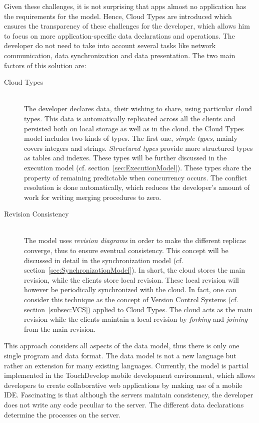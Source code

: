 \documentclass[a4paper,12pt]{report}
\begin{document}
Given these challenges, it is not surprising that apps almost no application has the requirements for the model. Hence, Cloud Types are introduced which ensures the transparency of these challenges for the developer, which allows him to focus on more application-specific data declarations and operations. The developer do not need to take into account several tasks like network communication, data synchronization and data presentation. The two main factors of this solution are:

\begin{description}
 \item[Cloud Types] \hfill \\The developer declares data, their wishing to share, using particular cloud types. This data is automatically replicated across all the clients and persisted both on local storage as well as in the cloud. the Cloud Types model includes two kinds of types. The first one, \textit{simple types}, mainly covers integers and strings. \textit{Structured types} provide more structured types as tables and indexes. These types will be further discussed in the execution model (cf. section~\ref{sec:ExecutionModel}). These types share the property of remaining predictable when concurrency occurs. The conflict resolution is done automatically, which reduces the developer's amount of work for writing merging procedures to zero.
 \item[Revision Consistency] \hfill \\ The model uses \textit{revision diagrams} in order to make the different replicas converge, thus to ensure eventual consistency. This concept will be discussed in detail in the synchronization model (cf. section~\ref{sec:SynchronizationModel}). In short, the cloud stores the main revision, while the clients store local revision. These local revision will however be periodically synchronized with the cloud. In fact, one can consider this technique as the concept of Version Control Systems (cf. section~\ref{subsec:VCS}) applied to Cloud Types. The cloud acts as the main revision while the clients maintain a local revision by \textit{forking} and \textit{joining} from the main revision.
\end{description} 

This approach considers all aspects of the data model, thus there is only one single program and data format. The data model is not a new language but rather an extension for many existing languages. Currently, the model is partial implemented in the TouchDevelop mobile development environment, which allows developers to create collaborative web applications by making use of a mobile IDE. Fascinating is that although the servers maintain consistency, the developer does not write any code peculiar to the server. The different data declarations determine the processes on the server. 
\end{document}
